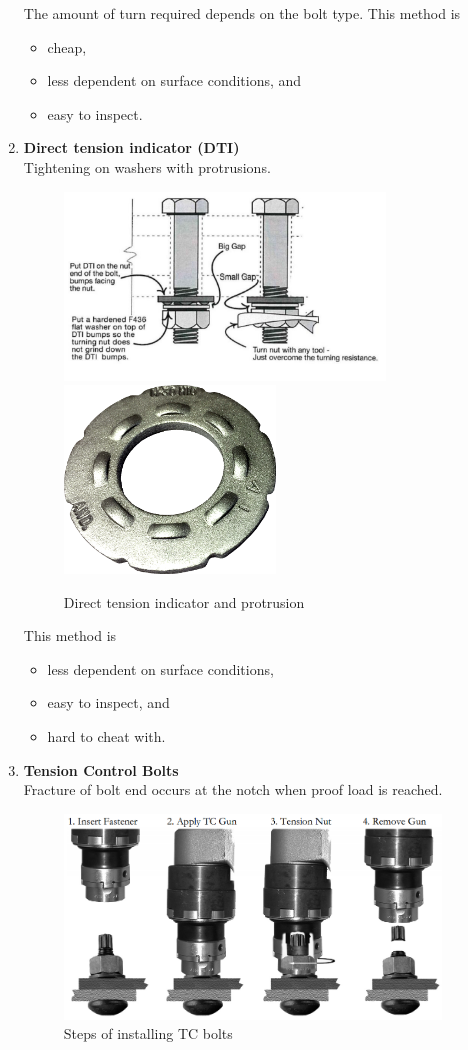 \begin{enumerate}
The amount of turn required depends on the bolt type. This method is
\begin{itemize}
\item cheap,
\item less dependent on surface conditions, and
\item easy to inspect.
\end{itemize}
\item \textbf{Direct tension indicator (DTI)}\\Tightening on washers with protrusions.
\begin{figure}[H]
\centering\includegraphics[height=5cm]{PIC/CH06/DTI}
\includegraphics[height=5cm]{PIC/CH06/PRO}
\caption{Direct tension indicator and protrusion}
\end{figure}
This method is
\begin{itemize}
\item less dependent on surface conditions,
\item easy to inspect, and
\item hard to cheat with.
\end{itemize}
\item \textbf{Tension Control Bolts}\\Fracture of bolt end occurs at the notch when proof load is reached.
\begin{figure}[H]
\centering
\includegraphics[width=10cm]{PIC/CH06/TCB}\caption{Steps of installing TC bolts}

\end{figure}
\end{enumerate}
